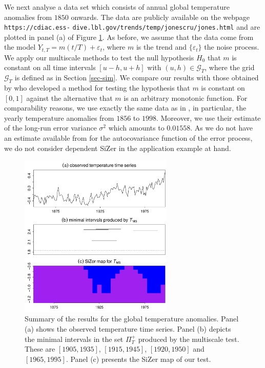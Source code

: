 We next analyse a data set which consists of annual global temperature anomalies from $1850$ onwards. The data are publicly available on the webpage \texttt{https://cdiac.ess-} \texttt{dive.lbl.gov/trends/temp/jonescru/jones.html} and are plotted in panel (a) of Figure \ref{fig:app:global}. As before, we assume that the data come from the model $Y_{t,T} = m(t/T) + \varepsilon_t$, where $m$ is the trend and $\{\varepsilon_t\}$ the noise process. We apply our multiscale methods to test the null hypothesis $H_0$ that $m$ is constant on all time intervals $[u-h,u+h]$ with $(u,h) \in \mathcal{G}_T$, where the grid $\mathcal{G}_T$ is defined as in Section \ref{sec-sim}. We compare our results with those obtained by \cite{WuWoodroofeMentz2001} who developed a method for testing the hypothesis that $m$ is constant on $[0,1]$ against the alternative that $m$ is an arbitrary monotonic function. For comparability reasons, we use exactly the same data as in \cite{WuWoodroofeMentz2001}, in particular, the yearly temperature anomalies from $1856$ to $1998$. Moreover, we use their estimate of the long-run error variance $\sigma^2$ which amounts to $0.01558$. As we do not have an estimate available from \cite{WuWoodroofeMentz2001} for the autocovariance function of the error process, we do not consider dependent SiZer in the application example at hand.


\begin{figure}[t!]
\centering
\includegraphics[width=0.65\textwidth]{Plots/global_temperature.pdf}
\caption{Summary of the results for the global temperature anomalies. Panel (a) shows the observed temperature time series. Panel (b) depicts the minimal intervals in the set $\Pi_T^+$ produced by the multiscale test. These are $[1905,1935]$, $[1915,1945]$, $[1920,1950]$ and $[1965,1995]$. Panel (c) presents the SiZer map of our test. }\label{fig:app:global}
\end{figure}


